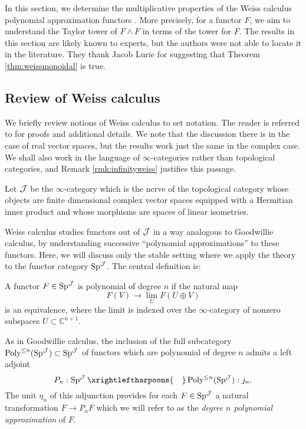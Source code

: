 In this section, we determine the multiplicative properties of the Weiss calculus polynomial approximation functors \cite{Weiss}.  More precisely, for a functor $F$, we aim to understand the Taylor tower of $F\wedge F$ in terms of the tower for $F.$  The results in this section are likely known to experts, but the authors were not able to locate it in the literature.  They thank Jacob Lurie for suggesting that Theorem \ref{thm:weissmonoidal} is true.

\subsection{Review of Weiss calculus}
We briefly review notions of Weiss calculus to set notation.  The reader is referred to \cite{Weiss} for proofs and additional details.  We note that the discussion there is in the case of real vector spaces, but the results work just the same in the complex case.  We shall also work in the language of $\infty$-categories rather than topological categories, and Remark \ref{rmk:infinityweiss} justifies this passage.  

Let $\operatorname{\mathcal{J}}$ be the $\infty$-category which is the nerve of the topological category whose objects are finite dimensional complex vector spaces equipped with a Hermitian inner product and whose morphisms are spaces of linear isometries.  

Weiss calculus studies functors out of $\operatorname{\mathcal{J}}$ in a way analogous to Goodwillie calculus, by understanding successive ``polynomial approximations'' to these functors.  Here, we will discuss only the stable setting where we apply the theory to the functor category $\operatorname{\mathrm{Sp}}^{\operatorname{\mathcal{J}}}$. The central definition is:

\begin{dfn}\label{dfn:polyfun}
A functor $F\in \operatorname{\mathrm{Sp}}^{\operatorname{\mathcal{J}}}$ is polynomial of degree $n$ if the natural map $$F(V) \to \lim_U F(U\oplus V)$$ is an equivalence, where the limit is indexed over the $\infty$-category of nonzero subspaces $U\subset \mathbb{C}^{n+1}.$
\end{dfn}

As in Goodwillie calculus, the inclusion of the full subcategory $\operatorname{\text{Poly}}^{\leq n}(\operatorname{\mathrm{Sp}}^{\operatorname{\mathcal{J}}}) \subset \operatorname{\mathrm{Sp}}^{\operatorname{\mathcal{J}}}$ of functors which are polynomial of degree $n$ admits a left adjoint $$P_n: \Sp^{\J} \xrightleftharpoons{\quad} \Poly^{\leq n}(\Sp^{\J}): j_n.$$ 
 The unit $\eta_n$ of this adjunction provides for each $F\in \operatorname{\mathrm{Sp}}^{\operatorname{\mathcal{J}}}$ a natural transformation $F \to P_nF$ which we will refer to as the \emph{degree $n$ polynomial approximation} of $F$. 

